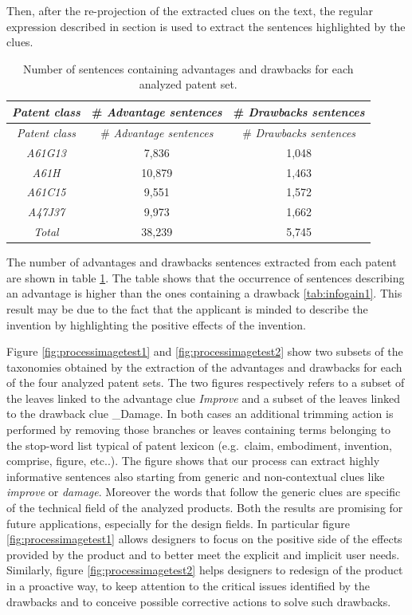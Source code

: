 \documentclass[]{book}
\begin{document}
Then, after the re-projection of the extracted clues on the text, the
regular expression described in section is used to extract the sentences
highlighted by the clues.

\begin{longtable}[]{@{}ccc@{}}
\caption{\label{tab:advantagedrawbackssentences} Number of sentences
containing advantages and drawbacks for each analyzed patent
set.}\tabularnewline
\toprule
\emph{Patent class} & \# \emph{Advantage sentences} & \# \emph{Drawbacks
sentences}\tabularnewline
\midrule
\endfirsthead
\toprule
\emph{Patent class} & \# \emph{Advantage sentences} & \# \emph{Drawbacks
sentences}\tabularnewline
\midrule
\endhead
\emph{A61G13} & 7,836 & 1,048\tabularnewline
\emph{A61H} & 10,879 & 1,463\tabularnewline
\emph{A61C15} & 9,551 & 1,572\tabularnewline
\emph{A47J37} & 9,973 & 1,662\tabularnewline
\emph{Total} & 38,239 & 5,745\tabularnewline
\bottomrule
\end{longtable}

The number of advantages and drawbacks sentences extracted from each
patent are shown in table \ref{tab:advantagedrawbackssentences}. The
table shows that the occurrence of sentences describing an advantage is
higher than the ones containing a drawback \ref{tab:infogain1}. This
result may be due to the fact that the applicant is minded to describe
the invention by highlighting the positive effects of the invention.

Figure \ref{fig:processimagetest1} and \ref{fig:processimagetest2} show
two subsets of the taxonomies obtained by the extraction of the
advantages and drawbacks for each of the four analyzed patent sets. The
two figures respectively refers to a subset of the leaves linked to the
advantage clue \emph{Improve} and a subset of the leaves linked to the
drawback clue \_Damage. In both cases an additional trimming action is
performed by removing those branches or leaves containing terms
belonging to the stop-word list typical of patent lexicon (e.g.~claim,
embodiment, invention, comprise, figure, etc..). The figure shows that
our process can extract highly informative sentences also starting from
generic and non-contextual clues like \emph{improve} or \emph{damage}.
Moreover the words that follow the generic clues are specific of the
technical field of the analyzed products. Both the results are promising
for future applications, especially for the design fields. In particular
figure \ref{fig:processimagetest1} allows designers to focus on the
positive side of the effects provided by the product and to better meet
the explicit and implicit user needs. Similarly, figure
\ref{fig:processimagetest2} helps designers to redesign of the product
in a proactive way, to keep attention to the critical issues identified
by the drawbacks and to conceive possible corrective actions to solve
such drawbacks.
\end{document}
